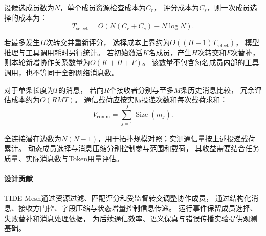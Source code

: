 设候选成员数为$N$，单个成员资源检查成本为$C_r$，
评分成本为$C_s$，则一次成员选择的成本为：
\begin{equation}
    T_{\mathrm{select}}
    =
    O\left(N(C_r+C_s)+N\log N\right).
\end{equation}

若最多发生$H$次转交并重新评分，
选择成本上界约为$O((H+1)T_{\mathrm{select}})$，
模型推理与工具调用耗时另行统计。
若初始激活$K$名成员，产生$H$次转交和$F$次替补，
则本轮新增协作关系数量为$O(K+H+F)$。
该数量不包含每名成员内部的工具调用，也不等同于全部网络消息数。

对于单条长度为$T$的消息，
若向$R$个接收者分别与至多$M$条历史消息比较，
冗余评估成本约为$O(RMT)$。
通信载荷应按实际投递次数和每次载荷求和：
\begin{equation}
    V_{\mathrm{comm}}
    =
    \sum_{j=1}^{J}\operatorname{Size}(m_j).
\end{equation}

全连接潜在边数为$N(N-1)$，用于拓扑规模对照；实测通信量按上述投递载荷累计。
动态成员选择与消息压缩分别控制参与范围和载荷，
其收益需要结合任务质量、实际消息数与Token用量评估。




\paragraph{设计贡献}

TIDE-Mesh通过资源过滤、匹配评分和受监督转交调整协作成员，
通过结构化消息、接收方门控、字段压缩与状态增量控制信息传递。
运行事件保留成员选择、失败替补和消息处理依据，
为后续通信效率、语义保真与错误传播实验提供观测基础。




